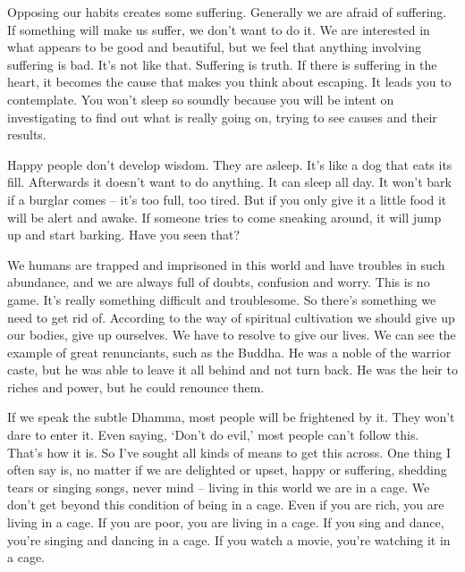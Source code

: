 Opposing our habits creates some suffering. Generally we are afraid of suffering. If something will make us suffer, we don't want to do it. We are interested in what appears to be good and beautiful, but we feel that anything involving suffering is bad. It's not like that. Suffering is  truth. If there is suffering in the heart, it becomes the cause that makes you think about escaping. It leads you to contemplate. You won't sleep so soundly because you will be intent on investigating to find out what is really going on, trying to see causes and their results. 

Happy people don't develop wisdom. They are asleep. It's like a dog that eats its fill. Afterwards it doesn't want to do anything. It can sleep all day. It won't bark if a burglar comes -- it's too full, too tired. But if you only give it a little food it will be alert and awake. If someone tries to come sneaking around, it will jump up and start barking. Have you seen that? 

We humans are trapped and imprisoned in this world and have troubles in such abundance, and we are always full of doubts, confusion and worry. This is no game. It's really something difficult and troublesome. So there's something we need to get rid of. According to the way of spiritual cultivation we should give up our bodies, give up ourselves. We have to resolve to give our lives. We can see the example of great renunciants, such as the Buddha. He was a noble of the warrior caste, but he was able to leave it all behind and not turn back. He was the heir to riches and power, but he could renounce them. 

If we speak the subtle Dhamma, most people will be frightened by it. They won't dare to enter it. Even saying, `Don't do evil,' most people can't follow this. That's how it is. So I've sought all kinds of means to get this across. One thing I often say is, no matter if we are delighted or upset, happy or suffering, shedding tears or singing songs, never mind -- living in this world we are in a cage. We don't get beyond this condition of being in a cage. Even if you are rich, you are living in a cage. If you are poor, you are living in a cage. If you sing and dance, you're singing and dancing in a cage. If you watch a movie, you're watching it in a cage. 

